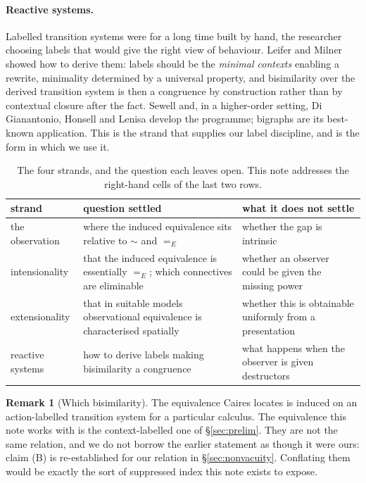 \documentclass[11pt]{article}
\theoremstyle{plain}
\theoremstyle{definition}
\newtheorem{remark}[theorem]{Remark}
\newcommand{\bis}{\sim}
\begin{document}
\paragraph{Reactive systems.} Labelled transition systems were for a long time built by hand, the
researcher choosing labels that would give the right view of behaviour. Leifer and Milner
\cite{LeiferMilner} showed how to derive them: labels should be the \emph{minimal contexts} enabling a
rewrite, minimality determined by a universal property, and bisimilarity over the derived transition
system is then a congruence by construction rather than by contextual closure after the fact. Sewell
\cite{Sewell} and, in a higher-order setting, Di Gianantonio, Honsell and Lenisa \cite{LambdaLTS}
develop the programme; bigraphs \cite{Bigraphs} are its best-known application. This is the strand
that supplies our label discipline, and \cite{BIHOL} is the form in which we use it.

\begin{table}[t]
\centering
\begin{tabular}{@{}p{3.0cm}p{5.3cm}p{5.2cm}@{}}
\toprule
\textbf{strand} & \textbf{question settled} & \textbf{what it does not settle} \\
\midrule
the observation & where the induced equivalence sits relative to $\bis$ and $=_E$ &
whether the gap is intrinsic \\
intensionality & that the induced equivalence is essentially $=_E$; which connectives are eliminable &
whether an observer could be given the missing power \\
extensionality & that in suitable models observational equivalence is characterised spatially &
whether this is obtainable uniformly from a presentation \\
reactive systems & how to derive labels making bisimilarity a congruence &
what happens when the observer is given destructors \\
\bottomrule
\end{tabular}
\caption{The four strands, and the question each leaves open. This note addresses the right-hand cells
of the last two rows.}
\label{tab:lineages}
\end{table}

\begin{remark}[Which bisimilarity]
\label{rem:whichbisim}
The equivalence Caires locates is induced on an action-labelled transition system for a particular
calculus. The equivalence this note works with is the context-labelled one of \S\ref{sec:prelim}. They
are not the same relation, and we do not borrow the earlier statement as though it were ours: claim (B)
is re-established for our relation in \S\ref{sec:nonvacuity}. Conflating them would be exactly the sort
of suppressed index this note exists to expose.
\end{remark}
\end{document}
